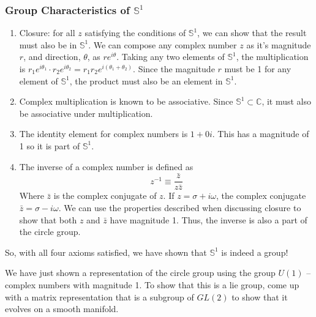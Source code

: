 \subsubsection{Group Characteristics of $\mathbb{S}^1$}
\begin{enumerate}
    \item Closure: for all $z$ satisfying the conditions of $\mathbb{S}^1$, we can show that the result must also be in $\mathbb{S}^1$. We can compose any complex number $z$ as it's magnitude $r$, and direction, $\theta$, as $re^{i\theta}$. Taking any two elements of $\mathbb{S}^1$, the multiplication is $r_1e^{i\theta_1}\cdot r_2e^{i\theta_2}=r_1r_2e^{i(\theta_1+\theta_2)}$. Since the magnitude $r$ must be 1 for any element of $\mathbb{S}^1$, the product must also be an element in $\mathbb{S}^1$.
    \item Complex multiplication is known to be associative. Since $\mathbb{S}^1\subset\mathbb{C}$, it must also be associative under multiplication.
    \item The identity element for complex numbers is $1+0i$. This has a magnitude of 1 so it is part of $\mathbb{S}^1$.
    \item The inverse of a complex number is defined as $$z^{-1}\equiv\frac{\bar{z}}{z\bar{z}}$$
Where $\bar{z}$ is the complex conjugate of $z$. If $z=\sigma+i\omega$, the complex conjugate $\bar{z}=\sigma-i\omega$. We can use the properties described when discussing closure to show that both $z$ and $\bar{z}$ have magnitude 1. Thus, the inverse is also a part of the circle group.
\end{enumerate}

So, with all four axioms satisfied, we have shown that $\mathbb{S}^1$ is indeed a group! 

\begin{exercise}
We have just shown a representation of the circle group using the group $U(1)$ -- complex numbers with magnitude 1. To show that this is a \gls{lie group}, come up with a matrix representation that is a subgroup of $GL(2)$ to show that it evolves on a smooth manifold.
\end{exercise}

